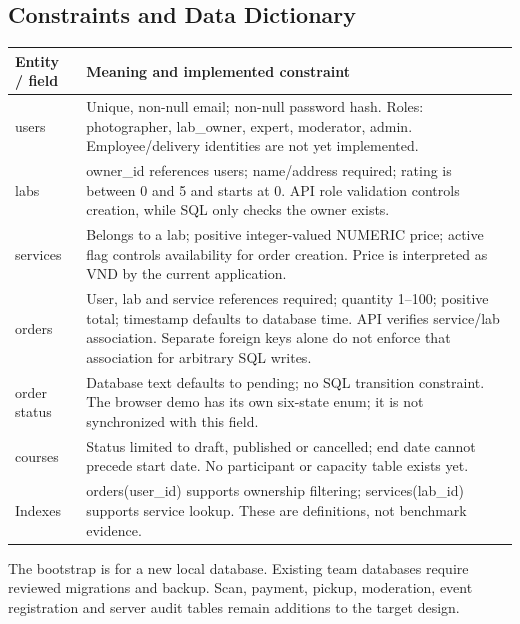 \subsection{Constraints and Data Dictionary}
\begin{longtable}{p{}p{}}
\toprule\textbf{Entity / field} & \textbf{Meaning and implemented constraint}\\\midrule\endhead
users & Unique, non-null email; non-null password hash. Roles: photographer, lab\_owner, expert, moderator, admin. Employee/delivery identities are not yet implemented.\\
labs & owner\_id references users; name/address required; rating is between 0 and 5 and starts at 0. API role validation controls creation, while SQL only checks the owner exists.\\
services & Belongs to a lab; positive integer-valued NUMERIC price; active flag controls availability for order creation. Price is interpreted as VND by the current application.\\
orders & User, lab and service references required; quantity 1--100; positive total; timestamp defaults to database time. API verifies service/lab association. Separate foreign keys alone do not enforce that association for arbitrary SQL writes.\\
order status & Database text defaults to pending; no SQL transition constraint. The browser demo has its own six-state enum; it is not synchronized with this field.\\
courses & Status limited to draft, published or cancelled; end date cannot precede start date. No participant or capacity table exists yet.\\
Indexes & orders(user\_id) supports ownership filtering; services(lab\_id) supports service lookup. These are definitions, not benchmark evidence.\\
\bottomrule
\end{longtable}
The bootstrap is for a new local database. Existing team databases require
reviewed migrations and backup. Scan, payment, pickup, moderation, event
registration and server audit tables remain additions to the target design.

